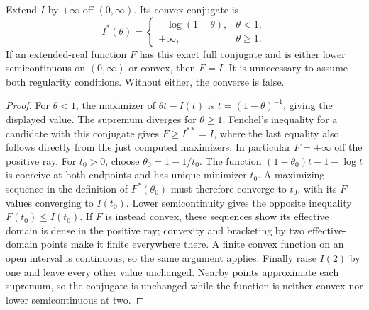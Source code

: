 \begin{theorem}
\label{final:C5}
Extend $I$ by $+\infty$ off $(0,\infty)$. Its convex conjugate is
\[
 I^*(\theta)=\begin{cases}-\log(1-\theta),&\theta<1,\\
 +\infty,&\theta\ge1.\end{cases}
\]
If an extended-real function $F$ has this exact full conjugate and
is either lower semicontinuous on $(0,\infty)$ or convex, then
$F=I$. It is unnecessary to assume both regularity conditions.
Without either, the converse is false.
\end{theorem}
\begin{proof}
For $\theta<1$, the maximizer of $\theta t-I(t)$ is
$t=(1-\theta)^{-1}$, giving the displayed value. The supremum
diverges for $\theta\ge1$. Fenchel's inequality for a candidate
with this conjugate gives $F\ge I^{**}=I$, where the last equality
also follows directly from the just computed maximizers. In particular
$F=+\infty$ off the positive ray. For $t_0>0$, choose
$\theta_0=1-1/t_0$. The function
$(1-\theta_0)t-1-\log t$ is coercive at both endpoints and has
unique minimizer $t_0$. A maximizing sequence in the definition of
$F^*(\theta_0)$ must therefore converge to $t_0$, with its $F$-values
converging to $I(t_0)$. Lower semicontinuity gives the opposite
inequality $F(t_0)\le I(t_0)$. If $F$ is instead convex, these
sequences show its effective domain is dense in the positive ray;
convexity and bracketing by two effective-domain points make it finite
everywhere there. A finite convex function on an open interval is
continuous, so the same argument applies. Finally raise $I(2)$ by
one and leave every other value unchanged. Nearby points approximate
each supremum, so the conjugate is unchanged while the function is
neither convex nor lower semicontinuous at two.
\end{proof}

